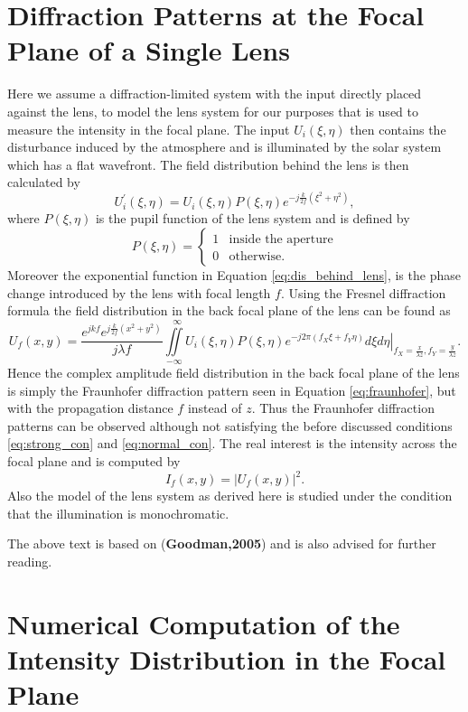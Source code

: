 \documentclass{article}
\begin{document}
\section{Diffraction Patterns at the Focal Plane of a Single Lens}
Here we assume a diffraction-limited system with the input directly placed against the lens, to model the lens system for our purposes that is used to measure the intensity in the focal plane. The input $U_i(\xi,\eta)$ then contains the disturbance induced by the atmosphere and is illuminated by the solar system which has a flat wavefront. The field distribution behind the lens is then calculated by
\begin{equation}
U^\prime_i(\xi,\eta)=U_i(\xi,\eta)P(\xi,\eta)e^{-j\frac{k}{2f}(\xi^2 + \eta^2)},
\label{eq:dis_behind_lens}
\end{equation}
where $P(\xi,\eta)$ is the pupil function of the lens system and is defined by
\begin{equation}
P(\xi,\eta)= \begin{cases} 1 & \text{inside the aperture} \\ 0 & \text{otherwise.} \end{cases}
\end{equation}
Moreover the exponential function in Equation \eqref{eq:dis_behind_lens}, is the phase change introduced by the lens with focal length $f$. Using the Fresnel diffraction formula the field distribution in the back focal plane of the lens can be found as
\begin{equation}
U_f(x,y)=\frac{e^{jkf}e^{j\frac{k}{2f}(x^2+y^2)}}{j\lambda f}\iint\limits_{-\infty}^{~~~\infty} \left. U_i(\xi,\eta)P(\xi,\eta)e^{-j2\pi(f_X\xi+f_Y\eta)}d\xi d\eta \right|_{f_X=\frac{x}{\lambda z},f_Y=\frac{y}{\lambda z}}.
\end{equation}
Hence the complex amplitude field distribution in the back focal plane of the lens is simply the Fraunhofer diffraction pattern seen in Equation \eqref{eq:fraunhofer}, but with the propagation distance $f$ instead of $z$. Thus the Fraunhofer diffraction patterns can be observed although not satisfying the before discussed conditions \eqref{eq:strong_con} and \eqref{eq:normal_con}. The real interest is the intensity across the focal plane and is computed by
\begin{equation}
I_f(x,y)=|U_f(x,y)|^2.
\end{equation}
Also the model of the lens system as derived here is studied under the condition that the illumination is monochromatic. 


The above text is based on (\textbf{Goodman,2005}) and is also advised for further reading.

\section{Numerical Computation of the Intensity Distribution in the Focal Plane}
\end{document}
